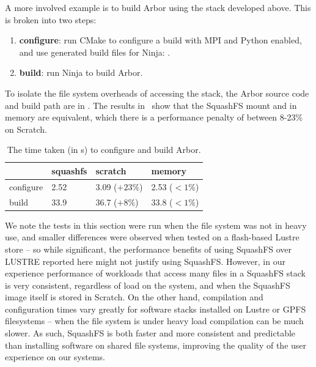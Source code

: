 A more involved example is to build Arbor using the stack developed above.
This is broken into two steps:
\begin{enumerate}
    \item \textbf{configure}: run CMake to configure a build with MPI and Python enabled, and use generated build files for Ninja: .
    \item \textbf{build}: run Ninja to build Arbor.
\end{enumerate}

To isolate the file system overheads of accessing the stack, the Arbor source code and build path are in .
The results in~ show that the SquashFS mount and in memory are equivalent, which there is a performance penalty of between 8-23\% on Scratch.

\begin{table}[htp!]
    \begin{center}
        \begin{tabular}{l | l l l}
                        & squashfs & scratch & memory \\
                \hline
            configure   & 2.52    & 3.09 ($+23\%$)  & 2.53 ($<1\%$) \\
            build       & 33.9    & 36.7 ($+8\%$)   & 33.8 ($<1\%$) \\
        \end{tabular}
    \end{center}
    \caption{The time taken (in s) to configure and build Arbor.}
    \label{tbl:arbor-compile}
\end{table}


We note the tests in this section were run when the file system was not in heavy use, and smaller differences were observed when tested on a flash-based Lustre store -- so while significant, the performance benefits of using SquashFS over LUSTRE  reported here might not justify using SquashFS.
However, in our experience performance of workloads that access many files in a SquashFS stack is very consistent, regardless of load on the system, and when the SquashFS image itself is stored in Scratch.
On the other hand, compilation and configuration times vary greatly for software stacks installed on Lustre or GPFS filesystems -- when the file system is under heavy load compilation can be much slower.
As such, SquashFS is both faster and more consistent and predictable than installing software on shared file systems, improving the quality of the user experience on our systems.

